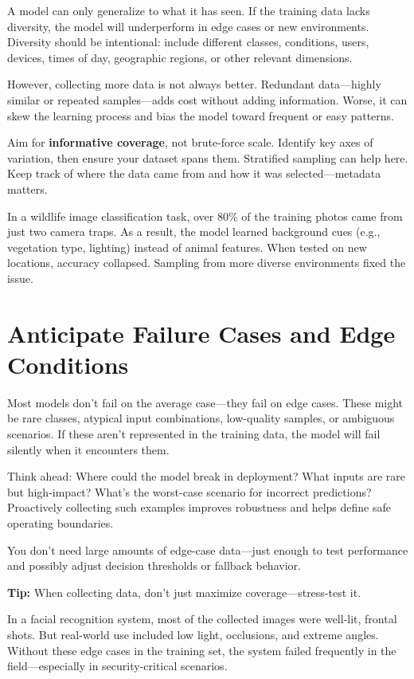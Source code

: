 \documentclass[12pt,openany]{book}
\begin{document}
A model can only generalize to what it has seen. If the training data lacks diversity, the model will underperform in edge cases or new environments. Diversity should be intentional: include different classes, conditions, users, devices, times of day, geographic regions, or other relevant dimensions.

However, collecting more data is not always better. Redundant data—highly similar or repeated samples—adds cost without adding information. Worse, it can skew the learning process and bias the model toward frequent or easy patterns.

Aim for \textbf{informative coverage}, not brute-force scale. Identify key axes of variation, then ensure your dataset spans them. Stratified sampling can help here. Keep track of where the data came from and how it was selected—metadata matters.

\begin{examplebox}
In a wildlife image classification task, over 80\% of the training photos came from just two camera traps. As a result, the model learned background cues (e.g., vegetation type, lighting) instead of animal features. When tested on new locations, accuracy collapsed. Sampling from more diverse environments fixed the issue.
\end{examplebox}



\section{Anticipate Failure Cases and Edge Conditions}

Most models don't fail on the average case—they fail on edge cases. These might be rare classes, atypical input combinations, low-quality samples, or ambiguous scenarios. If these aren't represented in the training data, the model will fail silently when it encounters them.

Think ahead: Where could the model break in deployment? What inputs are rare but high-impact? What’s the worst-case scenario for incorrect predictions? Proactively collecting such examples improves robustness and helps define safe operating boundaries.

You don’t need large amounts of edge-case data—just enough to test performance and possibly adjust decision thresholds or fallback behavior.

\textbf{Tip:} When collecting data, don’t just maximize coverage—stress-test it.

\begin{examplebox}
In a facial recognition system, most of the collected images were well-lit, frontal shots. But real-world use included low light, occlusions, and extreme angles. Without these edge cases in the training set, the system failed frequently in the field—especially in security-critical scenarios.
\end{examplebox}
\end{document}
